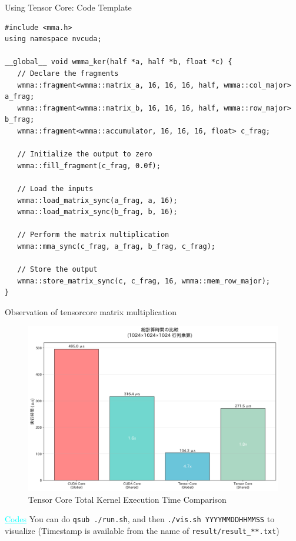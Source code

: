 \documentclass[dvipdfmx, 11pt, aspectratio=169]{beamer}   %
\newcommand{\ulhref}[2]{\href{#1}{\textcolor{cyan}{\uline{#2}}}}
\begin{document}
\begin{frame}[fragile]{Using Tensor Core: Code Template}
\begin{lstlisting}[language=CUDA, basicstyle=\ttfamily\tiny]
#include <mma.h>
using namespace nvcuda;

__global__ void wmma_ker(half *a, half *b, float *c) {
   // Declare the fragments
   wmma::fragment<wmma::matrix_a, 16, 16, 16, half, wmma::col_major> a_frag;
   wmma::fragment<wmma::matrix_b, 16, 16, 16, half, wmma::row_major> b_frag;
   wmma::fragment<wmma::accumulator, 16, 16, 16, float> c_frag;

   // Initialize the output to zero
   wmma::fill_fragment(c_frag, 0.0f);

   // Load the inputs
   wmma::load_matrix_sync(a_frag, a, 16);
   wmma::load_matrix_sync(b_frag, b, 16);

   // Perform the matrix multiplication
   wmma::mma_sync(c_frag, a_frag, b_frag, c_frag);

   // Store the output
   wmma::store_matrix_sync(c, c_frag, 16, wmma::mem_row_major);
}
\end{lstlisting}
\end{frame}
\begin{frame}[fragile]{Observation of tensorcore matrix multiplication}
\begin{figure}
  \includegraphics[scale=0.25]{img/tensorcoreTotalComputeTimeComparison.png}
  \caption{Tensor Core Total Kernel Execution Time Comparison}
\end{figure}
\vspace{-\baselineskip}

\ulhref{https://github.com/gunnersgoestocl/cuda-introduction/blob/main/tensorcore/}{Codes} 
{\small
You can do \lstinline|qsub ./run.sh|, and then \lstinline|./vis.sh YYYYMMDDHHMMSS| to visualize (Timestamp is available from the name of  \lstinline|result/result_**.txt|)}
\end{frame}
\end{document}
